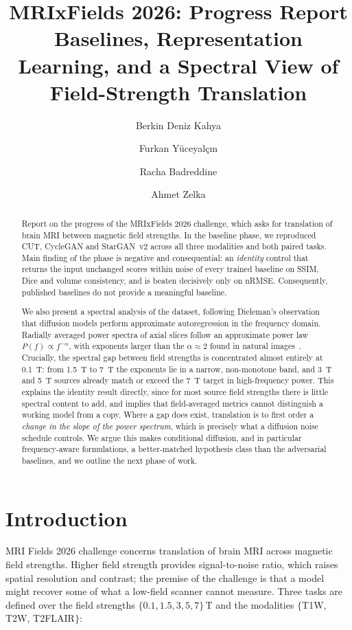 \documentclass[11pt,a4paper]{article}
\title{\bfseries MRIxFields 2026: Progress Report\\[0.3em]
\large Baselines, Representation Learning, and a Spectral View of Field-Strength Translation}
\author{Berkin Deniz Kahya \and Furkan Yüceyalçın \and Racha Badreddine \and Ahmet Zelka}
\date{}
\newcommand{\rmse}{nRMSE}
\begin{document}
\maketitle

\begin{abstract}
\noindent
Report on the progress of the MRIxFields 2026 challenge, which asks for translation of brain MRI between
magnetic field strengths. In the baseline phase, we reproduced CUT, CycleGAN and StarGAN~v2 across all three
modalities and both paired tasks. Main finding of the phase is negative and consequential: an
\emph{identity} control that returns the input unchanged scores within noise of every trained baseline
on SSIM, Dice and volume consistency, and is beaten decisively only on \rmse{}. Consequently, published
baselines do not provide a meaningful baseline.

We also present a spectral analysis of the dataset, following Dieleman's observation~\cite{dieleman2024} that diffusion
models perform approximate autoregression in the frequency domain. Radially averaged power spectra of
axial slices follow an approximate power law $P(f) \propto f^{-\alpha}$, with exponents
larger than the $\alpha \approx 2$ found in natural
images~\cite{vanderschaaf1996,torralba2003,hyvarinen2009}. Crucially, the spectral gap between field
strengths is concentrated almost entirely at \SI{0.1}{\tesla}: from \SI{1.5}{\tesla} to \SI{7}{\tesla}
the exponents lie in a narrow, non-monotone band, and \SI{3}{\tesla} and \SI{5}{\tesla} sources already
match or exceed the \SI{7}{\tesla} target in high-frequency power. This explains the identity result
directly, since for most source field strengths there is little spectral content to add, and implies
that field-averaged metrics cannot distinguish a working model from a copy. Where a gap does exist,
translation is to first order a \emph{change in the slope of the power spectrum}, which is precisely
what a diffusion noise schedule controls. We argue this makes conditional diffusion, and in particular
frequency-aware formulations, a better-matched hypothesis class than the adversarial
baselines, and we outline the next phase of work.
\end{abstract}

\section{Introduction}

MRI Fields 2026 challenge concerns translation of brain MRI across magnetic field strengths.
Higher field strength provides signal-to-noise ratio, which raises spatial resolution and contrast;
the premise of the challenge is that a model might recover some of what a low-field scanner cannot
measure. Three tasks are defined over the field strengths $\{0.1, 1.5, 3, 5, 7\}\,\si{\tesla}$ and the
modalities $\{$T1W, T2W, T2FLAIR$\}$:
\end{document}
